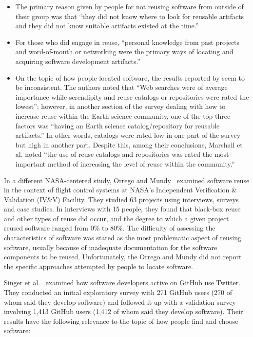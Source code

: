 \documentclass{casicswhitepaper}
\begin{document}
\begin{itemize}

\item The primary reason given by people for not reusing software from outside of their group was that ``they did not know where to look for reusable artifacts and they did not know suitable artifacts existed at the time.''

\item For those who did engage in reuse, ``personal knowledge from past projects and word-of-mouth or networking were the primary ways of locating and acquiring software development artifacts.''  

\item On the topic of how people located software, the results reported by \citet{marshall2006software} seem to be inconsistent.  The authors noted that ``Web searches were of average importance while serendipity and reuse catalogs or repositories were rated the lowest''; however, in another section of the survey dealing with how to increase reuse within the Earth science community, one of the top three factors was ``having an Earth science catalog/repository for reusable artifacts.''  In other words, catalogs were rated low in one part of the survey but high in another part.  Despite this, among their conclusions, Marshall et al. noted ``the use of reuse catalogs and repositories was rated the most important method of increasing the level of reuse within the community.''

\end{itemize}

In a different NASA-centered study, Orrego and Mundy~\cite{orrego_2007_study} examined software reuse in the context of flight control systems at NASA's Independent Verification \& Validation (IV\&V) Facility.  They studied 63 projects using interviews, surveys and case studies.  In interviews with 15 people, they found that black-box reuse and other types of reuse did occur, and the degree to which a given project reused software ranged from 0\% to 80\%.  The difficulty of assessing the characteristics of software was stated as the most problematic aspect of reusing software, usually because of inadequate documentation for the software components to be reused.  Unfortunately, the Orrego and Mundy did not report the specific approaches attempted by people to locate software.

Singer et al.~\cite{singer2014software} examined how software developers active on GitHub use Twitter.  They conducted an initial exploratory survey with 271 GitHub users (270 of whom said they develop software) and followed it up with a validation survey involving 1,413 GitHub users (1,412 of whom said they develop software).  Their results have the following relevance to the topic of how people find and choose software:
\end{document}
